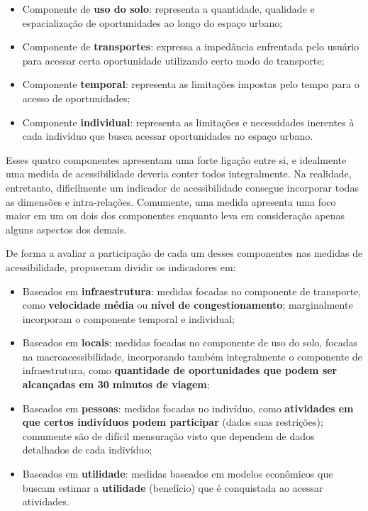 \documentclass[        
    a4paper,          %
    12pt,             %
    chapter=TITLE,    %
    section=Title,    %
    subsection=Title, %
    oneside,          %
    english,          %
    spanish,          %
    brazil,           %
    fleqn             %
]{abntex2}
\begin{document}
  \begin{itemize}
  \tightlist
  \item
    Componente de \textbf{uso do solo}: representa a quantidade, qualidade e espacialização de oportunidades ao longo do espaço urbano;
  \item
    Componente de \textbf{transportes}: expressa a impedância enfrentada pelo usuário para acessar certa oportunidade utilizando certo modo de transporte;
  \item
    Componente \textbf{temporal}: representa as limitações impostas pelo tempo para o acesso de oportunidades;
  \item
    Componente \textbf{individual}: representa as limitações e necessidades inerentes à cada indivíduo que busca acessar oportunidades no espaço urbano.
  \end{itemize}
  
  Esses quatro componentes apresentam uma forte ligação entre si, e idealmente uma medida de acessibilidade deveria conter todos integralmente. Na realidade, entretanto, dificilmente um indicador de acessibilidade consegue incorporar todas as dimensões e intra-relações. Comumente, uma medida apresenta uma foco maior em um ou dois dos componentes enquanto leva em consideração apenas alguns aspectos dos demais.
  
  De forma a avaliar a participação de cada um desses componentes nas medidas de acessibilidade, \citet{Geurs2004} propuseram dividir os indicadores em:
  
  \begin{itemize}
  \tightlist
  \item
    Baseados em \textbf{infraestrutura}: medidas focadas no componente de transporte, como \textbf{velocidade média} ou \textbf{nível de congestionamento}; marginalmente incorporam o componente temporal e individual;
  \item
    Baseados em \textbf{locais}: medidas focadas no componente de uso do solo, focadas na macroacessibilidade, incorporando também integralmente o componente de infraestrutura, como \textbf{quantidade de oportunidades que podem ser alcançadas em 30 minutos de viagem};
  \item
    Baseados em \textbf{pessoas}: medidas focadas no indivíduo, como \textbf{atividades em que certos indivíduos podem participar} (dados suas restrições); comumente são de difícil mensuração visto que dependem de dados detalhados de cada indivíduo;
  \item
    Baseados em \textbf{utilidade}: medidas baseados em modelos econômicos que buscam estimar a \textbf{utilidade} (benefício) que é conquistada ao acessar atividades.
  \end{itemize}
  
\end{document}
